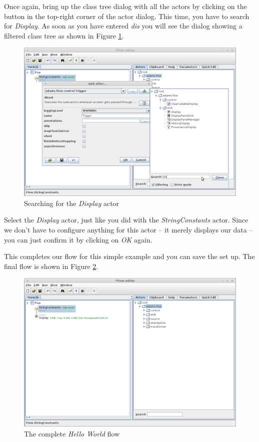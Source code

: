 Once again, bring up the class tree dialog with all the actors by clicking on
the button in the top-right corner of the actor dialog. This time, you have to
search for \textit{Display}. As soon as you have entered \textit{dis} you will
see the dialog showing a filtered class tree as shown in Figure
\ref{floweditor-helloworld-addactor7}.

\begin{figure}[htb]
  \centering
  \includegraphics[width=12.0cm]{images/floweditor-helloworld-addactor7.png}
  \caption{Searching for the \textit{Display} actor}
  \label{floweditor-helloworld-addactor7}
\end{figure}

Select the \textit{Display} actor, just like you did with the
\textit{StringConstants} actor. Since we don't have to configure anything for
this actor -- it merely displays our data -- you can just confirm it by clicking
on \textit{OK} again.

This completes our flow for this simple example and you can save the set up. The
final flow is shown in Figure \ref{floweditor-helloworld-flow}.

\begin{figure}[htb]
  \centering
  \includegraphics[width=12.0cm]{images/floweditor-helloworld-flow.png}
  \caption{The complete \textit{Hello World} flow}
  \label{floweditor-helloworld-flow}
\end{figure}

